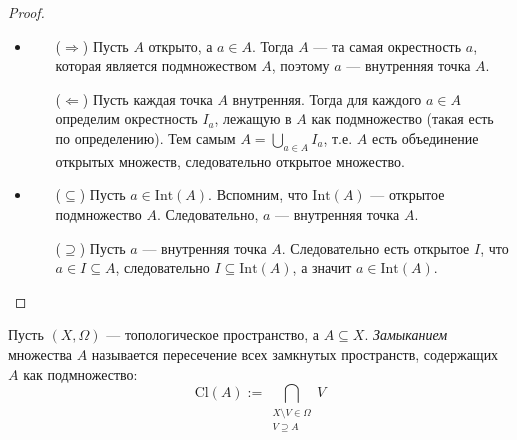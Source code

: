 \documentclass[12pt,a4paper]{article}
\newcommand{\Int}{\ensuremath{\mathrm{Int}}\xspace}
\newcommand{\Cl}{\ensuremath{\mathrm{Cl}}\xspace}
\begin{document}
    \begin{proof}\ 
        \begin{itemize}
            \item
                \begin{itemize}
                    \item[($\Rightarrow$)] Пусть $A$ открыто, а $a \in A$. Тогда $A$ --- та самая окрестность $a$, которая является подмножеством $A$, поэтому $a$ --- внутренняя точка $A$.
                    \item[($\Leftarrow$)] Пусть каждая точка $A$ внутренняя. Тогда для каждого $a \in A$ определим окрестность $I_a$, лежащую в $A$ как подмножество (такая есть по определению). Тем самым $A = \bigcup_{a \in A} I_a$, т.е. $A$ есть объединение открытых множеств, следовательно открытое множество.
                \end{itemize}
            \item
                \begin{itemize}
                    \item[($\subseteq$)] Пусть $a \in \Int(A)$. Вспомним, что $\Int(A)$ --- открытое подмножество $A$. Следовательно, $a$ --- внутренняя точка $A$.
                    \item[($\supseteq$)] Пусть $a$ --- внутренняя точка $A$. Следовательно есть открытое $I$, что $a \in I \subseteq A$, следовательно $I \subseteq \Int(A)$, а значит $a \in \Int(A)$.
                \end{itemize}
        \end{itemize}
    \end{proof}

    \begin{definition}
        Пусть $(X, \Omega)$ --- топологическое пространство, а $A \subseteq X$. \emph{Замыканием} множества $A$ называется пересечение всех замкнутых пространств, содержащих $A$ как подмножество:
        \[\Cl(A) := \bigcap_{\substack{X \setminus V \in \Omega\\V\supseteq A}} V\]
    \end{definition}
\end{document}
